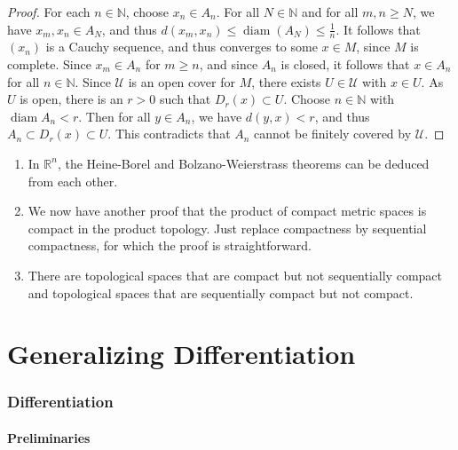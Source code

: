 \documentclass[a4paper]{article}
\begin{document}
\begin{proof}
For each $n \in \mathbb{N}$, choose $x_{n} \in A_{n}$. For all $N \in \mathbb{N}$ and for all $m, n \geqslant N$, we have $x_{m}, x_{n} \in A_{N}$, and thus $d\left(x_{m}, x_{n}\right) \leqslant \operatorname{diam}\left(A_{N}\right)\le\frac{1}{n}$. It follows that $\left(x_{n}\right)$ is a Cauchy sequence, and thus converges to some $x \in M$, since $M$ is complete. Since $x_{m} \in A_{n}$ for $m \geqslant n$, and since $A_{n}$ is closed, it follows that $x \in A_{n}$ for all $n \in \mathbb{N}$. Since $\mathcal{U}$ is an open cover for $M$, there exists $U \in \mathcal{U}$ with $x \in U$. As $U$ is open, there is an $r>0$ such that $D_{r}(x) \subset U$. Choose $n \in \mathbb{N}$ with $\operatorname{diam} A_{n}<r$. Then for all $y \in A_{n}$, we have $d(y, x)<r$, and thus $A_{n} \subset D_{r}(x) \subset U$. This contradicts that $A_{n}$ cannot be finitely covered by $\mathcal{U}$.
\end{proof}

\begin{remark}
    \begin{enumerate}
        \item In $\mathbb{R}^{n}$, the Heine-Borel and Bolzano-Weierstrass theorems can be deduced from each other.
      
        \item We now have another proof that the product of compact metric spaces is compact in the product topology. Just replace compactness by sequential compactness, for which the proof is straightforward.
      
        \item There are topological spaces that are compact but not sequentially compact and topological spaces that are sequentially compact but not compact.
      
      \end{enumerate}
\end{remark}

\clearpage
\part{Generalizing Differentiation}
\section{Differentiation}
\subsection{Preliminaries}
\end{document}
